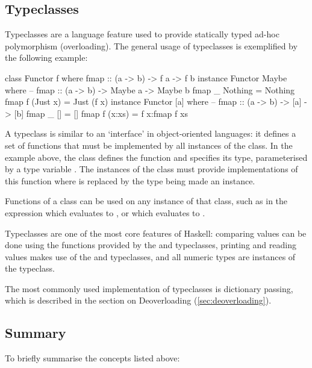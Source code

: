 \documentclass[dissertation.tex]{subfiles}
\begin{document}
{    \subsection{Typeclasses}\label{sec:typeclasses}
    {
        Typeclasses are a language feature used to provide statically typed ad-hoc polymorphism (overloading). The general usage of typeclasses is exemplified by the following example: 

        \begin{haskellfigure}
        class Functor f where
            fmap :: (a -> b) -> f a -> f b
        instance Functor Maybe where
            -- fmap :: (a -> b) -> Maybe a -> Maybe b
            fmap _ Nothing = Nothing
            fmap f (Just x) = Just (f x)
        instance Functor [a] where
            -- fmap :: (a -> b) -> [a] -> [b]
            fmap _ [] = []
            fmap f (x:xs) = f x:fmap f xs
        \end{haskellfigure}

        A typeclass is similar to an `interface' in object-oriented languages: it defines a set of functions that must be implemented by all instances of the class. In the example above, the  class defines the  function and specifies its type, parameterised by a type variable . The instances of the class must provide implementations of this function where  is replaced by the type being made an instance.

        Functions of a class can be used on any instance of that class, such as in the expression  which evaluates to \haskell{[2,4,6]}, or  which evaluates to .

        Typeclasses are one of the most core features of Haskell: comparing values can be done using the functions provided by the  and  typeclasses, printing and reading values makes use of the  and  typeclasses, and all numeric types are instances of the  typeclass. 

        The most commonly used implementation of typeclasses is dictionary passing, which is described in the section on Deoverloading (\ref{sec:deoverloading}).
    }
    \subsection{Summary}
    {
        To briefly summarise the concepts listed above:

}}
\end{document}

